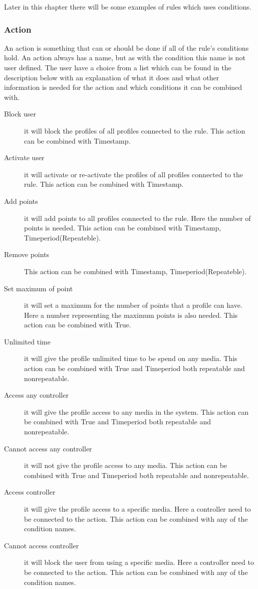Later in this chapter there will be some examples of rules which uses conditions.

\subsubsection{Action}
An action is something that can or should be done if all of the rule's conditions hold. An action always has a name, but as with the condition this name is not user defined. The user have a choice from a list which can be found in the description below with an explanation of what it does and what other information is needed for the action and which conditions it can be combined with.   

\begin{description}
	\item[Block user] it will block the profiles of all profiles connected to the rule. This action can be combined with Timestamp.
	\item[Activate user] it will activate or re-activate the profiles of all profiles connected to the rule. This action can be combined with Timestamp.
	\item[Add points] it will add points to all profiles connected to the rule. Here the number of points is needed. This action can be combined with Timestamp, Timeperiod(Repeateble).
	\item[Remove points]    This action can be combined with Timestamp, Timeperiod(Repeateble).
	\item[Set maximum of point] it will set a maximum for the number of points that a profile can have. Here a number representing the maximum points is also needed. This action can be combined with True.
	\item[Unlimited time] it will give the profile unlimited time to be spend on any media. This action can be combined with True and Timeperiod both repeatable and nonrepeatable.
	\item[Access any controller] it will give the profile access to any media in the system. This action can be combined with True and Timeperiod both repeatable and nonrepeatable.
	\item[Cannot access any controller] it will not give the profile access to any media. This action can be combined with True and Timeperiod both repeatable and nonrepeatable.
	\item[Access controller] it will give the profile access to a specific media. Here a controller need to be connected to the action. This action can be combined with any of the condition names.
	\item[Cannot access controller] it will block the user from using a specific media. Here a controller need to be connected to the action. This action can be combined with any of the condition names.
\end{description}
		
